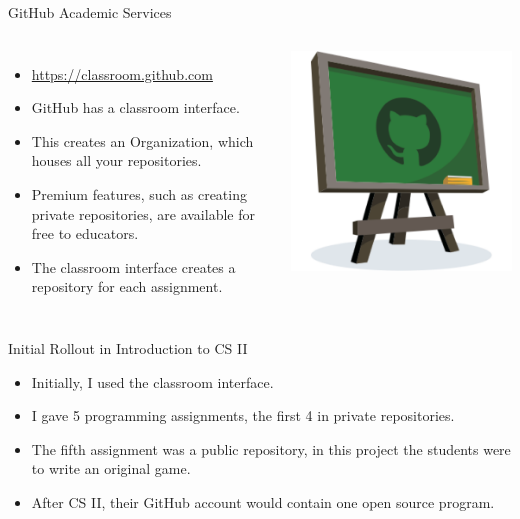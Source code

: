 \documentclass[handout]{beamer}
\begin{document}
\begin{frame}{GitHub Academic Services}
    \begin{columns}
        \begin{itemize}
            \item \url{https://classroom.github.com}
            \item GitHub has a classroom interface.
            \item This creates an Organization, which houses all your
                repositories.
            \item Premium features, such as creating private
                repositories, are available for free to educators.
            \item The classroom interface creates a repository for
                each assignment.
        \end{itemize}
        \includegraphics[width=\textwidth]{classroom-logo}
    \end{columns}
\end{frame}

\begin{frame}{Initial Rollout in Introduction to CS II}
    \begin{itemize}
        \item Initially, I used the classroom interface.
        \item I gave 5 programming assignments, the first 4 in private
            repositories.
        \item The fifth assignment was a public repository, in this
            project the students were to write an original game.
        \item After CS II, their GitHub account would contain one open
            source program.
    \end{itemize}
\end{frame}
\end{document}
